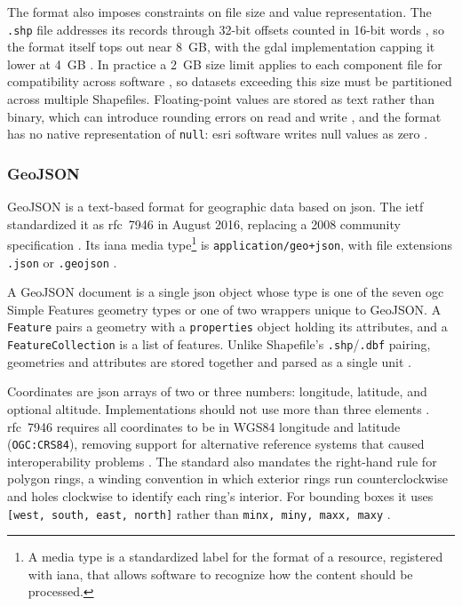 The format also imposes constraints on file size and value representation. The \texttt{.shp} file addresses its records through \num{32}-bit offsets counted in \num{16}-bit words \parencite{esri1998_shapefile_technical_description}, so the format itself tops out near \num{8}~GB, with the \acrshort{gdal} implementation capping it lower at \num{4}~GB \parencite{gdal2025_shapefile_driver}. In practice a \num{2}~GB size limit applies to each component file for compatibility across software \parencite{esri2024_arcmap_shapefile_output}, so datasets exceeding this size must be partitioned across multiple Shapefiles. Floating-point values are stored as text rather than binary, which can introduce rounding errors on read and write \parencite{esri2024_arcmap_shapefile_output}, and the format has no native representation of \texttt{null}: \acrshort{esri} software writes null values as zero \parencite{esri2024_arcmap_shapefile_output}.

\subsubsection{GeoJSON}
\label{background:spatial-data-formats-and-storage-models:file-formats:geojson}
GeoJSON is a text-based format for geographic data based on \acrfull{json}. The \acrfull{ietf} standardized it as \acrfull{rfc}~7946 in August 2016, replacing a 2008 community specification \parencite{butler2016_rfc7946_geojson_format}. Its \acrfull{iana} media type\footnote{A media type is a standardized label for the format of a resource, registered with \acrshort{iana}, that allows software to recognize how the content should be processed.} is \texttt{application/geo+json}, with file extensions \texttt{.json} or \texttt{.geojson} \parencite{butler2016_rfc7946_geojson_format}.

A GeoJSON document is a single \acrshort{json} object whose type is one of the seven \acrshort{ogc} Simple Features geometry types or one of two wrappers unique to GeoJSON. A \texttt{Feature} pairs a geometry with a \texttt{properties} object holding its attributes, and a \texttt{FeatureCollection} is a list of features. Unlike Shapefile's \texttt{.shp}/\texttt{.dbf} pairing, geometries and attributes are stored together and parsed as a single unit \parencite{butler2016_rfc7946_geojson_format}.

Coordinates are \acrshort{json} arrays of two or three numbers: longitude, latitude, and optional altitude. Implementations should not use more than three elements \parencite{butler2016_rfc7946_geojson_format}. \acrshort{rfc}~7946 requires all coordinates to be in WGS84 longitude and latitude (\texttt{OGC:CRS84}), removing support for alternative reference systems that caused interoperability problems \parencite{butler2016_rfc7946_geojson_format}. The standard also mandates the right-hand rule for polygon rings, a winding convention in which exterior rings run counterclockwise and holes clockwise to identify each ring's interior. For bounding boxes it uses \texttt{[west, south, east, north]} rather than \texttt{minx, miny, maxx, maxy} \parencite{butler2016_rfc7946_geojson_format}.

